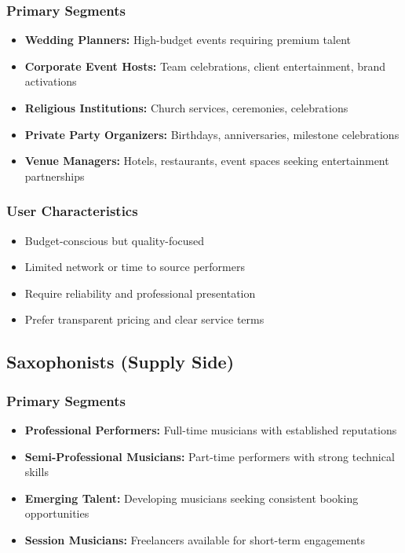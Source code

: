 \documentclass[11pt,a4paper]{article}
\begin{document}
\subsubsection{Primary Segments}
\begin{itemize}[leftmargin=1.5em]
  \item \textbf{Wedding Planners:} High-budget events requiring premium talent
  \item \textbf{Corporate Event Hosts:} Team celebrations, client entertainment,
        brand activations
  \item \textbf{Religious Institutions:} Church services, ceremonies,
        celebrations
  \item \textbf{Private Party Organizers:} Birthdays, anniversaries, milestone
        celebrations
  \item \textbf{Venue Managers:} Hotels, restaurants, event spaces seeking
        entertainment partnerships
\end{itemize}

\subsubsection{User Characteristics}
\begin{itemize}[leftmargin=1.5em]
  \item Budget-conscious but quality-focused
  \item Limited network or time to source performers
  \item Require reliability and professional presentation
  \item Prefer transparent pricing and clear service terms
\end{itemize}

\subsection{Saxophonists (Supply Side)}

\subsubsection{Primary Segments}
\begin{itemize}[leftmargin=1.5em]
  \item \textbf{Professional Performers:} Full-time musicians with established
        reputations
  \item \textbf{Semi-Professional Musicians:} Part-time performers with strong
        technical skills
  \item \textbf{Emerging Talent:} Developing musicians seeking consistent
        booking opportunities
  \item \textbf{Session Musicians:} Freelancers available for short-term
        engagements
\end{itemize}
\end{document}
